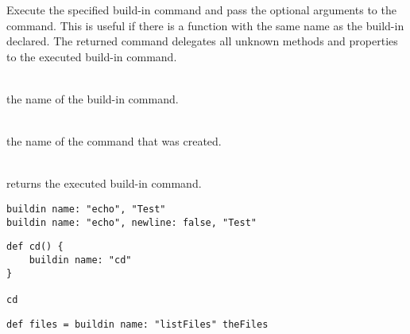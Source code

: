 %


Execute the specified build-in command and pass the optional arguments
to the command. This is useful if there is a function with the same name
as the build-in declared.
The returned command delegates all unknown methods and properties to the
executed build-in command.

\begin{asparadesc}
%
\item[\code{name: name}]  \hfill \\
the name of the build-in command.
%
\item[\code{theCommandName}]  \hfill \\
the name of the command that was created.
%
\item[\code{theCommand}]  \hfill \\
returns the executed build-in command.
%
\end{asparadesc}

\begin{lstlisting}[style=Groovybash, label={lst:example_buildin}, title={
Call build-in commands.}]
buildin name: "echo", "Test"
buildin name: "echo", newline: false, "Test"
\end{lstlisting}

\begin{lstlisting}[style=Groovybash, label={lst:example_buildin_override}, title={
Override build-in command.}]
def cd() {
    buildin name: "cd"
}

cd
\end{lstlisting}

\begin{lstlisting}[style=Groovybash, label={lst:example_buildin_delegate}, title={
Delegate the properties to the executed build-in command.}]
def files = buildin name: "listFiles" theFiles
\end{lstlisting}

